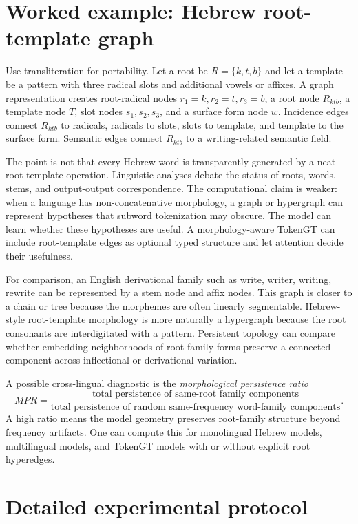 \documentclass[11pt]{article}
\newcommand{\1}{\mathbf{1}}
\begin{document}
\section{Worked example: Hebrew root-template graph}

Use transliteration for portability. Let a root be $R=\{k,t,b\}$ and let a template be a pattern with three radical slots and additional vowels or affixes. A graph representation creates root-radical nodes $r_1=k,r_2=t,r_3=b$, a root node $R_{ktb}$, a template node $T$, slot nodes $s_1,s_2,s_3$, and a surface form node $w$. Incidence edges connect $R_{ktb}$ to radicals, radicals to slots, slots to template, and template to the surface form. Semantic edges connect $R_{ktb}$ to a writing-related semantic field.

The point is not that every Hebrew word is transparently generated by a neat root-template operation. Linguistic analyses debate the status of roots, words, stems, and output-output correspondence. The computational claim is weaker: when a language has non-concatenative morphology, a graph or hypergraph can represent hypotheses that subword tokenization may obscure. The model can learn whether these hypotheses are useful. A morphology-aware TokenGT can include root-template edges as optional typed structure and let attention decide their usefulness.

For comparison, an English derivational family such as write, writer, writing, rewrite can be represented by a stem node and affix nodes. This graph is closer to a chain or tree because the morphemes are often linearly segmentable. Hebrew-style root-template morphology is more naturally a hypergraph because the root consonants are interdigitated with a pattern. Persistent topology can compare whether embedding neighborhoods of root-family forms preserve a connected component across inflectional or derivational variation.

A possible cross-lingual diagnostic is the \emph{morphological persistence ratio}
\[
MPR=\frac{\text{total persistence of same-root family components}}{\text{total persistence of random same-frequency word-family components}}.
\]
A high ratio means the model geometry preserves root-family structure beyond frequency artifacts. One can compute this for monolingual Hebrew models, multilingual models, and TokenGT models with or without explicit root hyperedges.

\section{Detailed experimental protocol}
\end{document}
